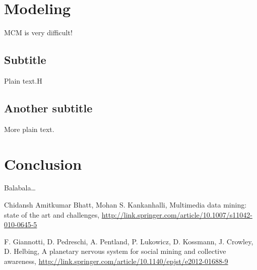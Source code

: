 \documentclass{icmmcm}
\begin{document}
\section{Modeling}
MCM is very difficult!

\subsection{Subtitle}
Plain text.H

\subsection{Another subtitle}
More plain text.

\section{Conclusion}
Balabala\ldots


\begin{thebibliography}{2}
Chidansh Amitkumar Bhatt, Mohan S. Kankanhalli,
Multimedia data mining: state of the art and challenges,
\url{http://link.springer.com/article/10.1007/s11042-010-0645-5}

F. Giannotti, D. Pedreschi, A. Pentland, P.
Lukowicz, D. Kossmann, J.
Crowley, D. Helbing,
A planetary nervous system for social mining and collective awareness,
\url{http://link.springer.com/article/10.1140/epjst/e2012-01688-9}

\end{thebibliography}
\end{document}
